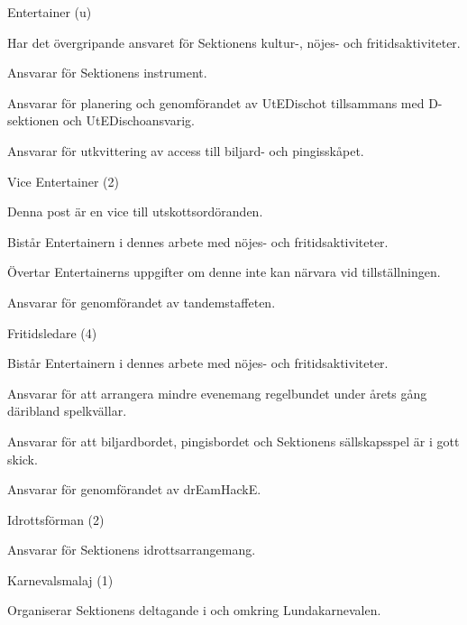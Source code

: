 \documentclass[10pt]{article}
\begin{document}
\begin{emptylist}
    \item Entertainer (u)
        \begin{dashlist}
          \item Har det övergripande ansvaret för Sektionens kultur-, nöjes- och fritidsaktiviteter.
          \item Ansvarar för Sektionens instrument.
          \item Ansvarar för planering och genomförandet av UtEDischot tillsammans med D-sektionen och UtEDischoansvarig.
          \item Ansvarar för utkvittering av access till biljard- och pingisskåpet.
        \end{dashlist}
    \item Vice Entertainer (2)
        \begin{dashlist}
            \item Denna post är en vice till utskottsordöranden.
          \item Bistår Entertainern i dennes arbete med nöjes- och fritidsaktiviteter.
          \item Övertar Entertainerns uppgifter om denne inte kan närvara vid tillställningen.
          \item Ansvarar för genomförandet av tandemstaffeten.
        \end{dashlist}
    \item Fritidsledare (4)
        \begin{dashlist}
            \item Bistår Entertainern i dennes arbete med nöjes- och fritidsaktiviteter.
            \item Ansvarar för att arrangera mindre evenemang regelbundet under årets gång däribland spelkvällar.
            \item Ansvarar för att biljardbordet, pingisbordet och Sektionens sällskapsspel är i gott skick.
	 \item Ansvarar för genomförandet av drEamHackE.
        \end{dashlist}
    \item Idrottsförman (2)
        \begin{dashlist}
            \item Ansvarar för Sektionens idrottsarrangemang.
        \end{dashlist}
    \item Karnevalsmalaj (1)
        \begin{dashlist}
            \item Organiserar Sektionens deltagande i och omkring Lundakarnevalen.

\end{dashlist}
\end{emptylist}
\end{document}
